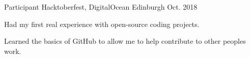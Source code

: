 \begin{cventries}

  \cventry
    {Participant} %
    {Hacktoberfest, DigitalOcean} %
    {Edinburgh} %
    {Oct. 2018} %
    {
      \begin{cvitems} %
        \item {Had my first real experience with open-source coding projects.}
        \item {Learned the basics of GitHub to allow me to help contribute to other peoples work.}
      \end{cvitems}
    }



\end{cventries}
